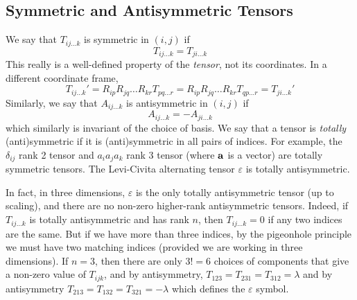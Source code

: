 \subsection{Symmetric and Antisymmetric Tensors}
We say that \(T_{ij\dots k}\) is symmetric in \((i, j)\) if
\[
	T_{ij\dots k} = T_{ji\dots k}
\]
This really is a well-defined property of the \textit{tensor}, not its coordinates.
In a different coordinate frame,
\[
	T_{ij\dots k}' = R_{ip}R_{jq}\dots R_{kr} T_{pq\dots r} = R_{ip}R_{jq}\dots R_{kr} T_{qp\dots r} = T_{ji\dots k}'
\]
Similarly, we say that \(A_{ij\dots k}\) is antisymmetric in \((i, j)\) if
\[
	A_{ij\dots k} = -A_{ji\dots k}
\]
which similarly is invariant of the choice of basis.
We say that a tensor is \textit{totally} (anti)symmetric if it is (anti)symmetric in all pairs of indices.
For example, the \(\delta_{ij}\) rank 2 tensor and \(a_ia_ja_k\) rank 3 tensor (where \(\vb a\) is a vector) are totally symmetric tensors.
The Levi-Civita alternating tensor \(\varepsilon\) is totally antisymmetric.

In fact, in three dimensions, \(\varepsilon\) is the only totally antisymmetric tensor (up to scaling), and there are no non-zero higher-rank antisymmetric tensors.
Indeed, if \(T_{ij\dots k}\) is totally antisymmetric and has rank \(n\), then \(T_{ij\dots k} = 0\) if any two indices are the same.
But if we have more than three indices, by the pigeonhole principle we must have two matching indices (provided we are working in three dimensions).
If \(n=3\), then there are only \(3! = 6\) choices of components that give a non-zero value of \(T_{ijk}\), and by antisymmetry, \(T_{123} = T_{231} = T_{312} = \lambda\) and by antisymmetry \(T_{213} = T_{132} = T_{321} = -\lambda\) which defines the \(\varepsilon\) symbol.

